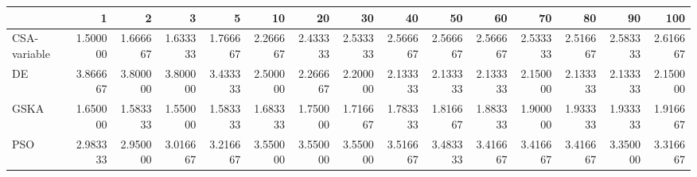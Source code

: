 \begin{tabular}{lrrrrrrrrrrrrrr}
\toprule
{} &       1   &       2   &       3   &       5   &       10  &       20  &       30  &       40  &       50  &       60  &       70  &       80  &       90  &       100 \\
\midrule
CSA-variable &  1.500000 &  1.666667 &  1.633333 &  1.766667 &  2.266667 &  2.433333 &  2.533333 &  2.566667 &  2.566667 &  2.566667 &  2.533333 &  2.516667 &  2.583333 &  2.616667 \\
DE           &  3.866667 &  3.800000 &  3.800000 &  3.433333 &  2.500000 &  2.266667 &  2.200000 &  2.133333 &  2.133333 &  2.133333 &  2.150000 &  2.133333 &  2.133333 &  2.150000 \\
GSKA         &  1.650000 &  1.583333 &  1.550000 &  1.583333 &  1.683333 &  1.750000 &  1.716667 &  1.783333 &  1.816667 &  1.883333 &  1.900000 &  1.933333 &  1.933333 &  1.916667 \\
PSO          &  2.983333 &  2.950000 &  3.016667 &  3.216667 &  3.550000 &  3.550000 &  3.550000 &  3.516667 &  3.483333 &  3.416667 &  3.416667 &  3.416667 &  3.350000 &  3.316667 \\
\bottomrule
\end{tabular}
